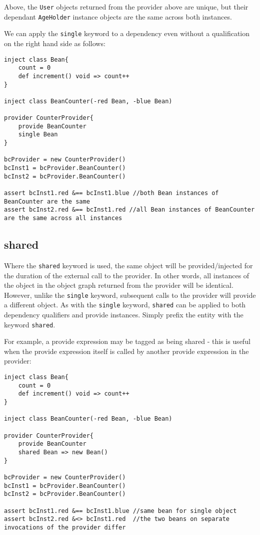 \documentclass[conc-doc]{subfiles}
\begin{document}
Above, the \lstinline{User} objects returned from the provider above are unique, but their dependant \lstinline{AgeHolder} instance objects are the same across both instances.

We can apply the \lstinline{single} keyword to a dependency even without a qualification on the right hand side as follows:

\begin{lstlisting}
inject class Bean{
	count = 0
	def increment() void => count++ 
}

inject class BeanCounter(-red Bean, -blue Bean)

provider CounterProvider{
	provide BeanCounter
	single Bean 
}

bcProvider = new CounterProvider()
bcInst1 = bcProvider.BeanCounter()
bcInst2 = bcProvider.BeanCounter()

assert bcInst1.red &== bcInst1.blue //both Bean instances of BeanCounter are the same
assert bcInst2.red &== bcInst1.red //all Bean instances of BeanCounter are the same across all instances
\end{lstlisting}



\subsection{shared}
Where the \lstinline{shared} keyword is used, the same object will be provided/injected for the duration of the external call to the provider. In other words, all instances of the object in the object graph returned from the provider will be identical. However, unlike the \lstinline{single} keyword, subsequent calls to the provider will provide a different object. As with the \lstinline{single} keyword, \lstinline{shared} can be applied to both dependency qualifiers and provide instances. Simply prefix the entity with the keyword \lstinline{shared}.

For example, a provide expression may be tagged as being shared - this is useful when the provide expression itself is called by another provide expression in the provider:

\begin{lstlisting}
inject class Bean{
	count = 0
	def increment() void => count++ 
}

inject class BeanCounter(-red Bean, -blue Bean)

provider CounterProvider{
	provide BeanCounter
	shared Bean => new Bean()
}

bcProvider = new CounterProvider()
bcInst1 = bcProvider.BeanCounter()
bcInst2 = bcProvider.BeanCounter()

assert bcInst1.red &== bcInst1.blue //same bean for single object
assert bcInst2.red &<> bcInst1.red  //the two beans on separate invocations of the provider differ
\end{lstlisting}
\end{document}
